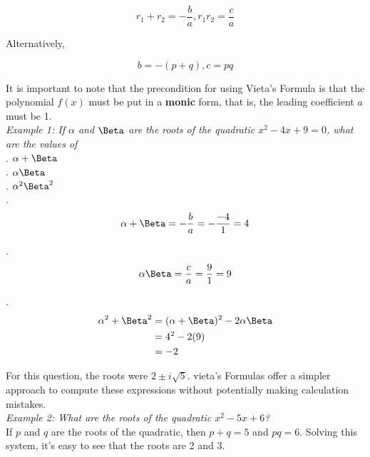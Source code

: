         \begin{equation*}
            r_1 + r_2 = -\frac{b}{a}, r_1 r_2 = \frac{c}{a}
        \end{equation*}

        \noindent Alternatively,

        \begin{equation*}
            b=-(p+q),c=pq
        \end{equation*}

        \noindent It is important to note that the precondition for using Vieta's Formula is that
        the polynomial $f(x)$ must be put in a \textbf{monic} form, that is, the leading coefficient
        $a$ must be 1. \\

        \noindent \color{blue} \textit{Example 1: If $\alpha$ and $\Beta$ are the roots of the
        quadratic $x^2-4x+9=0$, what are the values of} \\
        . $\alpha+\Beta$ \\
        . $\alpha\Beta$ \\
        . $\alpha^2\Beta^2$ \color{black} \\

        .
        \begin{equation*}
            \alpha + \Beta = -\frac{b}{a} = -\frac{-4}{1} = 4
        \end{equation*}

        .
        \begin{equation*}
            \alpha\Beta = \frac{c}{a} = \frac{9}{1} = 9
        \end{equation*}

        .
        \begin{align*}
            \alpha^2+\Beta^2 &= (\alpha + \Beta)^2 - 2\alpha\Beta \\
            &= 4^2 - 2(9) \\
            &= -2
        \end{align*}

        \noindent For this question, the roots were $2\pm i\sqrt{5}$. vieta's Formulas offer a
        simpler approach to compute these expressions without potentially making calculation
        mistakes. \\

        \noindent \color{blue} \textit{Example 2: What are the roots of the quadratic $x^2-5x+6$?} \color{black} \\
        \noindent If $p$ and $q$ are the roots of the quadratic, then $p+q=5$ and $pq=6$. Solving
        this system, it's easy to see that the roots are 2 and 3. \\

